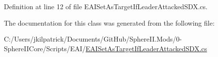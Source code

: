 Definition at line 12 of file E\+A\+I\+Set\+As\+Target\+If\+Leader\+Attacked\+S\+D\+X.\+cs.



The documentation for this class was generated from the following file\+:\begin{DoxyCompactItemize}
\item 
C\+:/\+Users/jkilpatrick/\+Documents/\+Git\+Hub/\+Sphere\+I\+I.\+Mods/0-\/\+Sphere\+I\+I\+Core/\+Scripts/\+E\+A\+I/\mbox{\hyperlink{_e_a_i_set_as_target_if_leader_attacked_s_d_x_8cs}{E\+A\+I\+Set\+As\+Target\+If\+Leader\+Attacked\+S\+D\+X.\+cs}}\end{DoxyCompactItemize}
